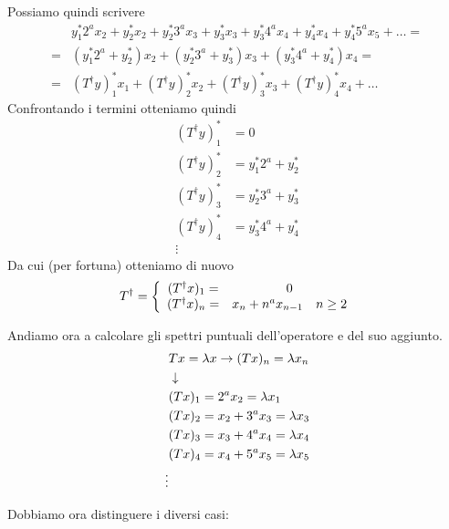 Possiamo quindi scrivere
\begin{align}
	&y_1^* 2^a x_2 + y_2^* x_2 + y_2^* 3^a x_3 + y_3^* x_3 + y_3^* 4^a x_4  + y_4^* x_4 + y_4^* 5^a x_5 + \dots = \nonumber \\
	=& (y_1^* 2^a + y_2^*)x_2 + (y_2^* 3^a + y_3^*) x_3 + (y_3^* 4^a + y_4^*) x_4 =  \\
	=&(T^\dagger y)_1^* x_1 + (T^\dagger y)_2^* x_2 + (T^\dagger y)_3^* x_3 + (T^\dagger y)_4^* x_4 + \dots
\end{align}
Confrontando i termini otteniamo quindi
\begin{align}
	(T^\dagger y)_1^* &= 0\\
	(T^\dagger y)_2^* &= y_1^* 2^a + y_2^*\\
	(T^\dagger y)_3^* &= y_2^* 3^a + y_3^*\\
	(T^\dagger y)_4^* &=y_3^* 4^a + y_4^*\\
	\vdots \nonumber
\end{align}
Da cui (per fortuna) otteniamo di nuovo
\begin{align}
	T^\dagger = \left\{ \begin{array}{cc} (T^\dagger x)_1 =& 0\\ (T^\dagger x)_n =& x_n + n^a x_{n-1} \quad n \geq 2 \end{array} \right.
\end{align}

Andiamo ora a calcolare gli spettri puntuali dell'operatore e del suo aggiunto.
\begin{align}
	&Tx = \lambda x \to (Tx)_n = \lambda x_n\\ &\downarrow \nonumber \\
	&(Tx)_1 = 2^a x_2 = \lambda x_1\\
	&(Tx)_2 = x_2 + 3^a x_3 = \lambda x_3\\
	&(Tx)_3 = x_3 + 4^a x_4 = \lambda x_4\\
	&(Tx)_4 = x_4 + 5^a x_5 = \lambda x_5\\
	\vdots \nonumber
\end{align}

Dobbiamo ora distinguere i diversi casi: 

